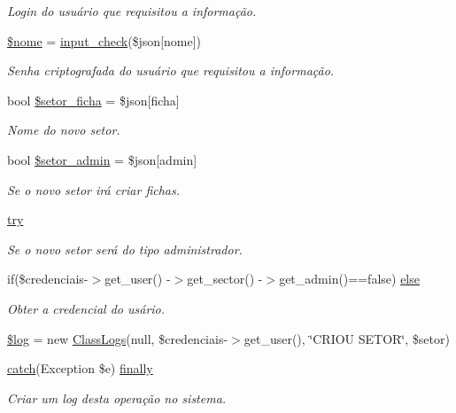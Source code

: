 \begin{DoxyCompactItemize}
\begin{DoxyCompactList}\small\item\em Login do usuário que requisitou a informação. \end{DoxyCompactList}\item 
\hyperlink{menu_2configuracoes_2setores_2new_8php_ac8c9d9dd5d90fa5854f0cb8397084ebd}{\$nome} = \hyperlink{_header_8php_a8909d20d656fecf83ebaa2bed0cab2c1}{input\+\_\+check}(\$json\mbox{[}\textquotesingle{}nome\textquotesingle{}\mbox{]})
\begin{DoxyCompactList}\small\item\em Senha criptografada do usuário que requisitou a informação. \end{DoxyCompactList}\item 
bool \hyperlink{menu_2configuracoes_2setores_2new_8php_a8d3ccd903d881b48bb755be5d3f314da}{\$setor\+\_\+ficha} = \$json\mbox{[}\textquotesingle{}ficha\textquotesingle{}\mbox{]}
\begin{DoxyCompactList}\small\item\em Nome do novo setor. \end{DoxyCompactList}\item 
bool \hyperlink{menu_2configuracoes_2setores_2new_8php_a3ba57324c35a68927cefc5e241e29d3c}{\$setor\+\_\+admin} = \$json\mbox{[}\textquotesingle{}admin\textquotesingle{}\mbox{]}
\begin{DoxyCompactList}\small\item\em Se o novo setor irá criar fichas. \end{DoxyCompactList}\item 
\hyperlink{menu_2configuracoes_2setores_2new_8php_abe4cc9788f52e49485473dc699537388}{try}
\begin{DoxyCompactList}\small\item\em Se o novo setor será do tipo administrador. \end{DoxyCompactList}\item 
if(\$credenciais-\/$>$get\+\_\+user() -\/$>$get\+\_\+sector() -\/$>$get\+\_\+admin()==false) \hyperlink{menu_2configuracoes_2setores_2new_8php_a8f5108ee2efdbfcd6f3d53b8abcb6c09}{else}
\begin{DoxyCompactList}\small\item\em Obter a credencial do usário. \end{DoxyCompactList}\item 
\hyperlink{menu_2configuracoes_2setores_2new_8php_a9a2cf15a653aee8be437f7ae474cd494}{\$log} = new \hyperlink{class_class_logs}{Class\+Logs}(null, \$credenciais-\/$>$get\+\_\+user(), \char`\"{}C\+R\+I\+OU S\+E\+T\+OR\char`\"{}, \$setor)
\item 
\hyperlink{imprimir_2ficha_2index_8php_a8104793004944f01dd070fc8b1ade3c4}{catch}(Exception \$e) \hyperlink{menu_2configuracoes_2setores_2new_8php_a1eb47d68a4a4f73debf91b15e179d813}{finally}
\begin{DoxyCompactList}\small\item\em Criar um log desta operação no sistema. \end{DoxyCompactList}\end{DoxyCompactItemize}


